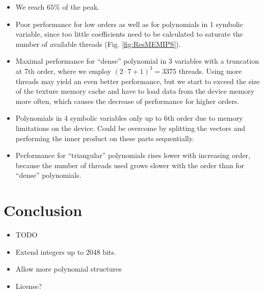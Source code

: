 \documentclass[oribibl,a4paper]{llncs2e/llncs}
\begin{document}
\begin{itemize}
\item We reach $65\%$ of the peak.
\item Poor performance for low orders as well as for polynomials in 1 symbolic variable, since too little coefficients need to be calculated to saturate the number of available threads (Fig. \ref{fig:ResMEMIPS}).
\item Maximal performance for ``dense'' polynomial in 3 variables with a truncation at 7th order, where we employ $(2\cdot7+1)^3 = 3375$ threads. Using more threads may yield an even better performance, but we start to exceed the size of the texture memory cache and have to load data from the device memory more often, which causes the decrease of performance for higher orders.
\item Polynomials in 4 symbolic variables only up to 6th order due to memory limitations on the device. Could be overcome by splitting the vectors and performing the inner product on these parts sequentially.
\item Performance for ``triangular'' polynomials rises lower with increasing order, because the number of threads used grows slower with the order than for ``dense'' polynomials.
\end{itemize}


\section{Conclusion}
\begin{itemize}
\item TODO
\item Extend integers up to 2048 bits.
\item Allow more polynomial structures
\item License?
\end{itemize}



\end{document}
